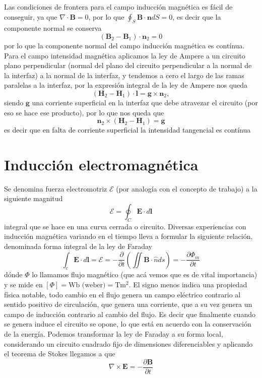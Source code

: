 \documentclass[11pt,a4paper]{article}
\numberwithin{equation}{section}
\begin{document}
Las condiciones de frontera para el campo inducción magnética es fácil de conseguir, ya que $\nabla \cdot \textbf{B} = 0$, por lo que $\oint_{S} \textbf{B} \cdot \textbf{n} dS = 0$, es decir que la componente normal se conserva
\begin{equation}
    (\textbf{B}_2 - \textbf{B}_1)\cdot \textbf{n}_2 = 0
    \label{eq:m_induccion_interfaz}
\end{equation}
por lo que la componente normal del campo inducción magnética es contínua. Para el campo intensidad magnética aplicamos la ley de Ampere a un circuito plano perpendicular (normal del plano del circuito perpendicular a la normal de la interfaz) a la normal de la interfaz, y tendemos a cero el largo de las ramas paralelas a la interfaz, por la expresión integral de la ley de Ampere nos queda \[(\textbf{H}_2 - \textbf{H}_1)\cdot \textbf{l} = \textbf{g} \times \textbf{n}_2,\] siendo $\textbf{g}$ una corriente superficial en la interfaz que debe atravezar el circuito (por eso se hace ese producto), por lo que nos queda que
\begin{equation}
    \textbf{n}_2 \times (\textbf{H}_2 - \textbf{H}_1) = \textbf{g}
    \label{eq:m_intensidad_interfaz}
\end{equation}
es decir que en falta de corriente superficial la intensidad tangencial es contínua
\section{Inducción electromagnética}
Se denomina fuerza electromotriz $\mathcal{E}$ (por analogía con el concepto de trabajo) a la siguiente magnitud
\begin{equation}
    \mathcal{E} = \oint_{C} \textbf{E} \cdot d\textbf{l}
    \label{eq:im_fem}
\end{equation}
integral que se hace en una curva cerrada o circuito. Diversas experiencias con inducción magnética variando en el tiempo lleva a formular la siguiente relación, denominada forma integral de la ley de Faraday
\begin{equation}
    \int_c \textbf{E} \cdot d\textbf{l} = \mathcal{E} = -
    \frac{\partial}{\partial t} \left(\iint \textbf{B} \cdot \hat{n} ds \right) = -
    \frac{\partial \Phi_m}{\partial t}
    \label{eq:im_faraday_int}
\end{equation}
dónde $\Phi$ lo llamamos flujo magnético (que acá vemos que es de vital importancia) y se mide en $[\Phi] = \text{Wb (weber)} = \text{T}\text{m}^{2}$. El signo menos indica una propiedad física notable, todo cambio en el flujo genera un campo eléctrico contrario al sentido positivo de circulación, que genera una corriente, que a su vez genera un campo de inducción contrario al cambio del flujo. Es decir que finalmente cuando se genera induce el circuito se opone, lo que está en acuerdo con la conservación de la energía. Podemos transformar la ley de Faraday a su forma local, considerando un circuito cuadrado fijo de dimensiones diferenciables y aplicando el teorema de Stokes llegamos a que
\begin{equation}
    \nabla \times \textbf{E} = - \frac{\partial \textbf{B}}{\partial t}
    \label{eq:im_faraday_dif}
\end{equation}
\end{document}
